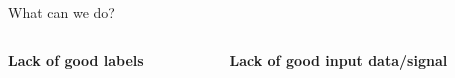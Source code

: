 \documentclass[8pt,xcolor=table,aspectratio=169]{beamer}
\begin{document}
\begin{frame}{What can we do?}


\vspace{-8em}
\begin{columns}[t]
\begin{column}{0.5\textwidth}
\centering

\textbf{\large Lack of good labels}

% 
%  
% 

\vspace{2em}


\end{column}
\begin{column}{0.5\textwidth}
\centering

\textbf{\large Lack of good input data/signal}


% 
% 
% 


\end{column}
\end{columns}
\end{frame}
\end{document}
